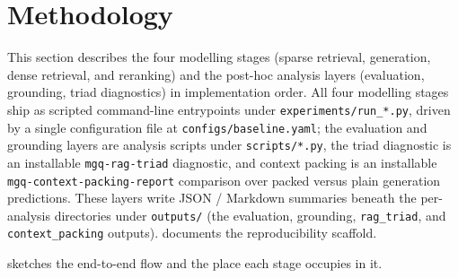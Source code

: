 \documentclass[11pt,a4paper]{article}
\begin{document}
\clearpage\section{Methodology}
\label{sec:method}

This section describes the four modelling stages (sparse retrieval,
generation, dense retrieval, and reranking) and the
post-hoc analysis layers (evaluation, grounding, triad diagnostics)
in implementation order.  All
four modelling stages ship as scripted command-line entrypoints under
\texttt{experiments/run\_*.py}, driven by a single configuration
file at \texttt{configs/baseline.yaml}; the evaluation and grounding
layers are analysis scripts
under \texttt{scripts/*.py}, the triad diagnostic is an installable
\texttt{mgq-rag-triad} diagnostic, and context packing is an installable
\texttt{mgq-context-packing-report} comparison over packed versus
plain generation predictions.  These layers write JSON / Markdown
summaries beneath the per-analysis directories under \texttt{outputs/}
(the evaluation, grounding, \texttt{rag\_triad}, and
\texttt{context\_packing} outputs).
 documents the reproducibility scaffold.

 sketches the end-to-end flow and the place each
stage occupies in it.
\end{document}
